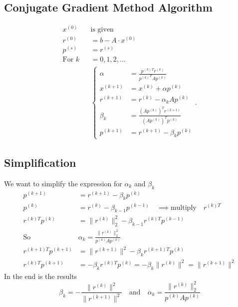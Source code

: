\documentclass{article}
\theoremstyle{remark}
\begin{document}
 \subsection{Conjugate Gradient Method Algorithm}%
 \label{sub:conjuaget_gradient_method_algorithm}

 \begin{align*}
   x^{(0)} \quad  & \text{is given}  \\
   r^{(0)} &=   b - A\cdot x^{(0)}  \\
   p^{(s)} &=   r^{(s)}  \\
   \text{For } k&=   0,1,2, \ldots \\
    &   \begin{cases}
    \alpha &=   \frac{p^{(k)T} r^{(k)}}{{p^{(k)}}^{T} A p^{(k)}}  \\
     x ^{(k+1)} &=  x ^{(k)} + \alpha  p^{(k)}  \\
     r^{(k+1)} &=  r^{(k)} - \alpha _{k} A p^{(k)}  \\
     \beta _{k} &=  \frac{\left( A p^{(k)} \right)^{T} r^{(k+1)}}{ \left( Ap^{(k)} \right)^{T} p^{(k)}}   \\
     p^{(k+1)} &=  r^{(k+1)} - \beta _{k} p^{(k)} 
   \end{cases} 
 .\end{align*}
 
 \subsection{Simplification }%
 \label{sub:simplfication_}
 We want to simplify the expression for $\alpha _{k}  $ and $\beta  _{k}$
  \begin{align*}
    p^{(k+1)} &=  r^{(k+1)} - \beta  _{k} p^{(k)} \\
    p^{(k)} &=  r^{(k)} - \beta _{k-1} p^{(k-1)} \quad \implies \text{multiply} \quad  r^{(k)T}    \\
  r^{(k)T} p^{(k)} &= \|r^{(k)}\|_{2}^{2} - \beta _{k-1} r^{(k)T} p^{(k-1)} \\
  \text{So} \quad  &\alpha _{k} =  \frac{\|r^{(k)}\|_{2} ^{2} }{ p^{(k)} A p^{(k)}}     \\
  r^{(k+1)T} p^{(k+1) } &=   \|r^{(k+1)}\|^2 - \beta _{k} r^{(k+1)T} p^{(k)}  \\
  r^{(k)T} p^{(k+1)} &=  - \beta _{k} r^{(k)T} p^{(k)} = - \beta _{k} \|r^{(k)}\|^2 = \|r^{(k+1)}\|^2 
\end{align*}
In the end is the results \[
\beta _{k} = - \frac{\|r^{(k)}\|^2}{\|r^{(k+1)}\|^2} \quad \text{and} \quad    \alpha _{k} =  \frac{\|r^{(k)}\|_{2} ^{2} }{ p^{(k)} A p^{(k)}}    
\] 
\end{document}

